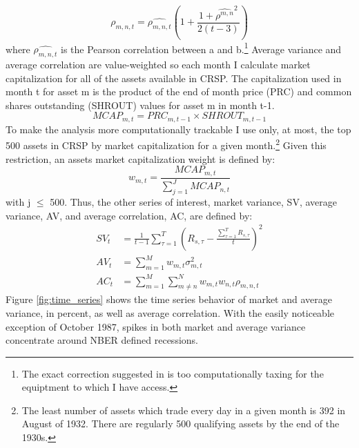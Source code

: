 \begin{equation}
	\rho_{m,n,t} = \widehat{\rho_{m,n,t}}\left(1 + \frac{1+\widehat{\rho^{m,n}}^{2}}{2(t-3)}\right)
\end{equation}
where $\widehat{\rho_{m,n,t}}$ is the Pearson correlation between a and b.\footnote{The exact correction suggested in \cite{olkin_1958} is too computationally taxing for the equiptment to which I have access.} Average variance and average correlation are value-weighted so each month I calculate market capitalization for all of the assets available in CRSP. The capitalization used in month t for asset m is the product of the end of month price (PRC) and common shares outstanding (SHROUT) values for asset m in month t-1. 
\begin{equation}
MCAP_{m,t} = PRC_{m,t-1}\times SHROUT_{m,t-1}
\end{equation}
To make the analysis more computationally trackable I use only, at most, the top 500 assets in CRSP by market capitalization for a given month.\footnote{The least number of assets which trade every day in a given month is 392 in August of 1932. There are regularly 500 qualifying assets by the end of the 1930s.} Given this restriction, an assets market capitalization weight is defined by:
\begin{equation}
w_{m,t} = \frac{MCAP_{m,t}}{\sum_{j=1}^{J}MCAP_{n,t}}
\end{equation}
with j $\leq$ 500. Thus, the other series of interest, market variance, SV, average variance, AV, and average correlation, AC, are defined by:
\begin{align}
	SV_{t} &= \frac{1}{t-1}\sum_{\tau = 1}^{T} \left(R_{s,\tau} - \frac{\sum_{\tau = 1}^{T} R_{s,\tau}}{t}\right)^{2}\\
	AV_{t} &= \sum_{m=1}^{M} w_{m,t}\sigma^{2}_{m,t}\\
	AC_{t} &= \sum_{m=1}^{M}\sum_{m \neq n}^{N}w_{m,t}w_{n,t}\rho_{m,n,t}
\end{align}
Figure \ref{fig:time_series} shows the time series behavior of market and average variance, in percent, as well as
average correlation. With the easily noticeable exception of October 1987, spikes in both market and average variance concentrate around NBER defined recessions.

